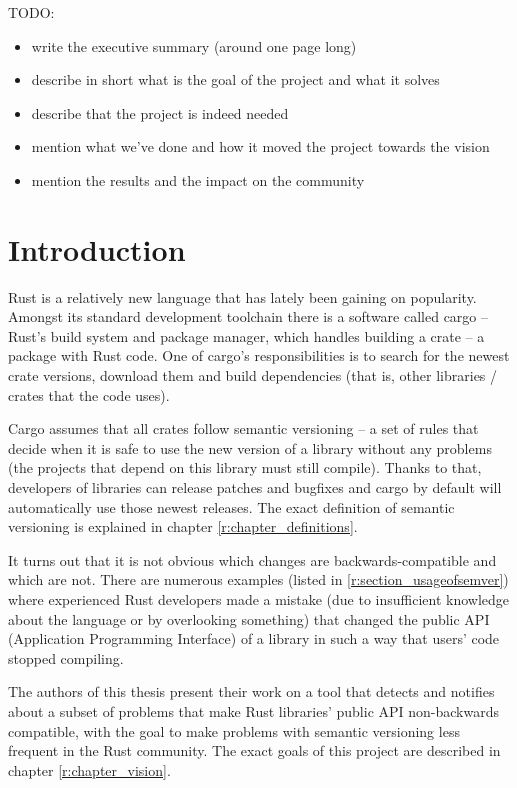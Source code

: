 \documentclass[licencjacka,en]{pracamgr}
\begin{document}
TODO:
\begin{itemize}
	\item write the executive summary (around one page long)
	\item describe in short what is the goal of the project and what it solves
	\item describe that the project is indeed needed
	\item mention what we've done and how it moved the project towards the vision
	\item mention the results and the impact on the community
\end{itemize}

\chapter*{Introduction}

Rust is a relatively new language that has lately been gaining on popularity.
Amongst its standard development toolchain there is a software called cargo
-- Rust's build system and package manager,
which handles building a crate -- a package with Rust code.
One of cargo's responsibilities is to search for the newest crate versions,
download them and build dependencies
(that is, other libraries / crates that the code uses).

Cargo assumes that all crates follow semantic versioning
-- a set of rules that decide when it is safe to use the new version of a library
without any problems (the projects that depend on this library must still compile).
Thanks to that, developers of libraries can release patches and bugfixes
and cargo by default will automatically use those newest releases.
The exact definition of semantic versioning is explained in chapter \ref{r:chapter_definitions}.

It turns out that it is not obvious which changes are backwards-compatible
and which are not. There are numerous examples (listed in \ref{r:section_usageofsemver})
where experienced Rust developers made a mistake
(due to insufficient knowledge about the language or by overlooking something)
that changed the public API (Application Programming Interface) of a library in such a way that
users' code stopped compiling.

The authors of this thesis present their work on a tool that detects and notifies about
a subset of problems that make Rust libraries' public API non-backwards compatible,
with the goal to make problems with semantic versioning less frequent in the Rust community.
The exact goals of this project are described in chapter \ref{r:chapter_vision}.
\end{document}

